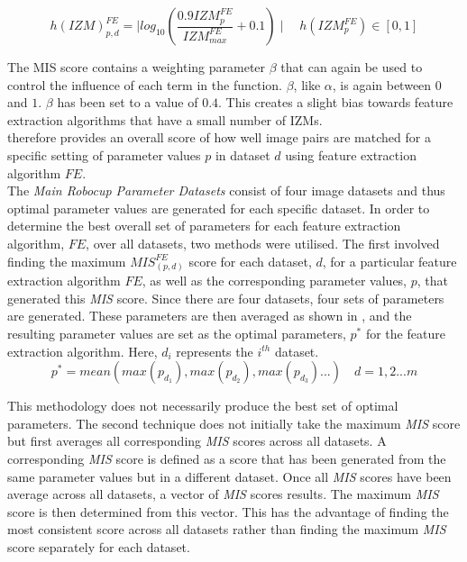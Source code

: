 \documentclass[11pt]{report}
\begin{document}
\begin{equation}
h(\textit{IZM})_{p, d}^{FE} = \mid log_{10}(\frac{0.9\textit{IZM}_{p}^{FE}}{\textit{IZM}_{max}^{FE}} + 0.1) \mid \quad h(\textit{IZM}_{p}^{FE})\in [0, 1]
\label{eqn:izm}
\end{equation}

The MIS score contains a weighting parameter $\beta$ that can again be used to control the influence of each term in the function. $\beta$, like $\alpha$, is again between $0$ and $1$. $\beta$ has been set to a value of $0.4$. This creates a slight bias towards feature extraction algorithms that have a small number of IZMs. \\

 therefore provides an overall score of how well image pairs are matched for a specific setting of parameter values $p$ in dataset $d$ using feature extraction algorithm $FE$. \\

The \textit{Main Robocup Parameter Datasets} consist of four image datasets and thus  optimal parameter values are generated for each specific dataset. In order to determine the best overall set of parameters for each feature extraction algorithm, $FE$, over all datasets, two methods were utilised. The first involved finding the maximum $\textit{MIS}_{(p, d)}^{FE}$ score for each dataset, $d$, for a particular feature extraction algorithm $FE$, as well as the corresponding parameter values, $p$, that generated this \textit{MIS} score. Since there are four datasets, four sets of parameters are generated. These parameters are then averaged as shown in , and the resulting parameter values are set as the optimal parameters, $p^*$ for the feature extraction algorithm. Here, $d_i$ represents the $i^{th}$ dataset.\\

\begin{equation}
p^* = mean( max(p_{d_1}), max(p_{d_2}), max(p_{d_3}) ...) \quad d = 1,2...m
\label{eqn:average}
\end{equation}

This methodology does not necessarily produce the best set of optimal parameters. The second technique does not initially take the maximum \textit{MIS} score but first averages all corresponding \textit{MIS} scores across all datasets. A corresponding \textit{MIS} score is defined as a score that has been generated from the same parameter values but in a different dataset. Once all \textit{MIS} scores have been average across all datasets, a vector of \textit{MIS} scores results. The maximum \textit{MIS} score is then determined from this vector. This has the advantage of finding the most consistent score across all datasets rather than finding the maximum \textit{MIS} score separately for each dataset.\\
\end{document}
